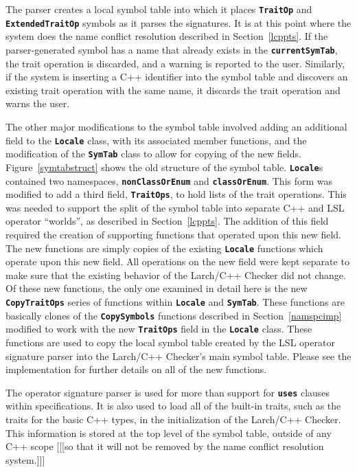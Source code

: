\documentclass[12pt]{article} %
\newcommand{\reserved}[1]{\textbf{\texttt{#1}}} %
\begin{document}
The parser creates a local symbol table into which it places
\reserved{TraitOp} and \reserved{ExtendedTraitOp} symbols as it parses
the signatures. It is at this point where the system does the name
conflict resolution described in Section~\ref{lcppts}. If the
parser-generated symbol has a name that already exists in the 
\reserved{currentSymTab}, the trait operation is discarded, and a
warning is reported to the user. Similarly, if the system is inserting a C++
identifier into the symbol table and discovers an existing trait operation
with the same name, it discards the trait operation and warns the user.

The other major modifications to the symbol table involved adding an
additional field to the \reserved{Locale} class, with its associated
member functions, and the modification of the \reserved{SymTab} class
to allow for copying of the new fields. Figure~\ref{symtabstruct}
shows the old structure of the symbol table. \reserved{Locale}s
contained two namespaces, \reserved{nonClassOrEnum} and
\reserved{classOrEnum}. This form was modified to add a third field,
\reserved{TraitOps}, to hold lists of the trait operations. This was
needed to support the split of the symbol table into separate C++ and
LSL operator ``worlds'', as described in Section~\ref{lcppts}. The
addition of this field required the creation of supporting functions
that operated upon this new field. The new functions are simply copies
of the existing \reserved{Locale} functions which operate upon this
new field. All operations on the new field were kept separate to make
sure that the existing behavior of the Larch/C++ Checker did not
change. Of these new functions, the only one examined in detail here
is the new \reserved{CopyTraitOps} series of functions within
\reserved{Locale} and
\reserved{SymTab}. These functions are basically clones of the
\reserved{CopySymbols} functions described in Section~\ref{namspcimp} modified
to work with the new \reserved{TraitOps} field in the
\reserved{Locale} class. These functions are used to copy the local
symbol table created by the LSL operator signature parser into the
Larch/C++ Checker's main symbol table. Please see the implementation
for further details on all of the new functions.

The operator signature parser is used for more than support for
\reserved{uses} clauses within specifications. It is also used to load
all of the built-in traits, such as the traits for the basic C++
types, in the initialization of the Larch/C++ Checker. This
information is stored at the top level of the symbol table, outside of
any C++ scope [[[so that it will not be removed by the name conflict
resolution system.]]]
\end{document}
